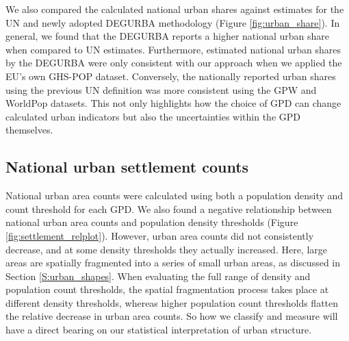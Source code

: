 \documentclass[review]{elsarticle}
\begin{document}
	We also compared the calculated national urban shares against estimates for the UN and newly adopted DEGURBA methodology (Figure \ref{fig:urban_share}).
	In general, we found that the DEGURBA reports a higher national urban share when compared to UN estimates.
	Furthermore, estimated national urban shares by the DEGURBA were only consistent with our approach when we applied the EU's own GHS-POP dataset.
	Conversely, the nationally reported urban shares using the previous UN definition was more consistent using the GPW and WorldPop datasets. 
	This not only highlights how the choice of GPD can change calculated urban indicators but also the uncertainties within the GPD themselves. 
	
	
	
	\subsection{National urban settlement counts}
	\label{S:nusc}
	National urban area counts were calculated using both a population density and count threshold for each GPD.
	We also found a negative relationship between national urban area counts and population density thresholds (Figure \ref{fig:settlement_relplot}).
	However, urban area counts did not consistently decrease, and at some density thresholds they actually increased.
	Here, large  areas are spatially fragmented into a series of small urban areas, as discussed in Section \ref{S:urban_shapes}.
	When evaluating the full range of density and population count thresholds, the spatial fragmentation process takes place at different density thresholds, whereas higher population count thresholds flatten the relative decrease in urban area counts.
	So how we classify and measure will have a direct bearing on our statistical interpretation of urban structure.
	
\end{document}
